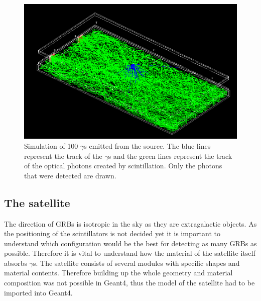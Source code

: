 \documentclass[12pt, a4paper,titlepage]{article}
\numberwithin{equation}{section}
\numberwithin{figure}{section}
\begin{document}
\begin{figure}[h!]
\centering
\includegraphics[width=160.0mm]{images/2channel.png}
\caption{Simulation of 100 $\gamma$s emitted from the source. The blue lines represent the track of the $\gamma$s and the green lines represent the track of the optical photons created by scintillation. Only the photons that were detected are drawn.}
\label{fig:sim_setup}
\end{figure}

\pagebreak

\subsection{The satellite}

The direction of GRBs is isotropic in the sky as they are extragalactic objects. As the positioning of the scintillators is not decided yet it is important to understand which configuration would be the best for detecting as many GRBs as possible. Therefore it is vital to understand how the material of the satellite itself absorbs $\gamma$s. The satellite consists of several modules with specific shapes and material contents. Therefore building up the whole geometry and material composition was not possible in Geant4, thus the model of the satellite had to be  imported into Geant4.
\end{document}
